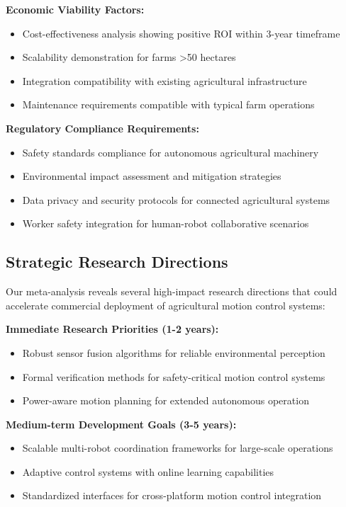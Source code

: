 \textbf{Economic Viability Factors:}
\begin{itemize}
    \item Cost-effectiveness analysis showing positive ROI within 3-year timeframe
    \item Scalability demonstration for farms >50 hectares
    \item Integration compatibility with existing agricultural infrastructure
    \item Maintenance requirements compatible with typical farm operations
\end{itemize}

\textbf{Regulatory Compliance Requirements:}
\begin{itemize}
    \item Safety standards compliance for autonomous agricultural machinery
    \item Environmental impact assessment and mitigation strategies
    \item Data privacy and security protocols for connected agricultural systems
    \item Worker safety integration for human-robot collaborative scenarios
\end{itemize}

\subsection{Strategic Research Directions}
\label{subsec:motion_strategic_directions}

Our meta-analysis reveals several high-impact research directions that could accelerate commercial deployment of agricultural motion control systems:

\textbf{Immediate Research Priorities (1-2 years):}
\begin{itemize}
    \item Robust sensor fusion algorithms for reliable environmental perception
    \item Formal verification methods for safety-critical motion control systems
    \item Power-aware motion planning for extended autonomous operation
\end{itemize}

\textbf{Medium-term Development Goals (3-5 years):}
\begin{itemize}
    \item Scalable multi-robot coordination frameworks for large-scale operations
    \item Adaptive control systems with online learning capabilities
    \item Standardized interfaces for cross-platform motion control integration
\end{itemize}

